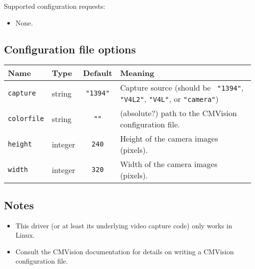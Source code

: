 \noindent Supported configuration requests:
\begin{itemize}
\item None.
\end{itemize}

\subsection*{Configuration file options}
\begin{center}
{\small \begin{tabularx}{\columnwidth}{|l|l|c|X|}
\hline
Name & Type & Default & Meaning\\
\hline
{\tt capture} & string & {\tt "1394"} & Capture source (should be {\tt
"1394"}, {\tt "V4L2"}, {\tt "V4L"}, or {\tt "camera"})\\
{\tt colorfile} & string & {\tt ""} & (absolute?) path to the CMVision configuration file.\\
{\tt height} & integer & {\tt 240} & Height of the camera images (pixels).\\
{\tt width} & integer & {\tt 320} & Width of the camera images (pixels).\\
\hline
\end{tabularx}}
\end{center}

\subsection*{Notes}
\begin{itemize}
\item This driver (or at least its underlying video capture code) only works in
Linux.
\item Consult the CMVision documentation for details on writing a CMVision
configuration file.
\end{itemize}

